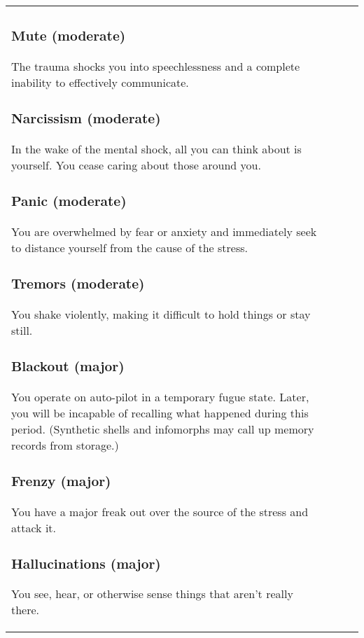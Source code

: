 \begin{table}
\begin{tabular}{|p{8cm}|r|r|r|}
\subsubsection{Mute (moderate)} 

The trauma shocks you into speechlessness and a complete inability to effectively communicate. 

\subsubsection{Narcissism (moderate)} 

In the wake of the mental shock, all you can think about is yourself. You cease caring about those around you. 

\subsubsection{Panic (moderate)} 

You are overwhelmed by fear or anxiety and immediately seek to distance yourself from the cause of the stress. 

\subsubsection{Tremors (moderate)} 

You shake violently, making it difficult to hold things or stay still. 

\subsubsection{Blackout (major)} 

You operate on auto-pilot in a temporary fugue state. Later, you will be incapable of recalling what happened during this period. (Synthetic shells and infomorphs may call up memory records from storage.) 

\subsubsection{Frenzy (major)} 

You have a major freak out over the source of the stress and attack it. 

\subsubsection{Hallucinations (major)} 

You see, hear, or otherwise sense things that aren’t really there. 


\end{tabular}
\end{table}

